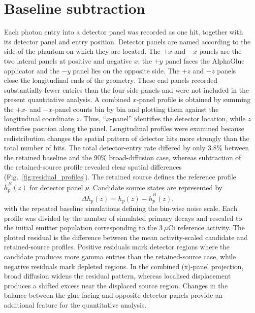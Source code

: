 \documentclass{iopconfser}
\begin{document}
\section{Baseline subtraction}

Each photon entry into a detector panel was recorded as one hit, together with its detector panel and entry position. Detector panels are named according to the side of the phantom on which they are located. The \(+x\) and \(-x\) panels are the two lateral panels at positive and negative \(x\); the \(+y\) panel faces the AlphaGlue applicator and the \(-y\) panel lies on the opposite side. The \(+z\) and \(-z\) panels close the longitudinal ends of the geometry. These end panels recorded substantially fewer entries than the four side panels and were not included in the present quantitative analysis. A combined \(x\)-panel profile is obtained by summing the \(+x\)- and \(-x\)-panel counts bin by bin and plotting them against the longitudinal coordinate \(z\). Thus, ``\(x\)-panel'' identifies the detector location, while \(z\) identifies position along the panel. Longitudinal profiles were examined because redistribution changes the spatial pattern of detector hits more strongly than the total number of hits. The total detector-entry rate differed by only 3.8\% between the retained baseline and the 90\% broad-diffusion case, whereas subtraction of the retained-source profile revealed clear spatial differences (Fig.~\ref{fig:residual_profiles}). The retained
source defines the reference profile \(\bar{h}^{B}_{p}(z)\) for detector panel
\(p\). Candidate source states are represented by
\begin{equation}
\Delta h_p(z)=h_p(z)-\bar{h}^{B}_{p}(z),
\end{equation}
with the repeated baseline simulations defining the bin-wise noise scale. Each profile was divided by the number of simulated primary decays and rescaled to the initial emitter population corresponding to the \(3~\mu\mathrm{Ci}\) reference activity. The plotted residual is the difference between the mean activity-scaled candidate and retained-source profiles. Positive residuals mark detector
regions where the candidate produces more gamma entries than the
retained-source case, while negative residuals mark depleted regions. In the
combined (x)-panel projection, broad diffusion widens the residual pattern,
whereas localised displacement produces a shifted excess near the displaced
source region. Changes in the balance between the glue-facing and opposite
detector panels provide an additional feature for the quantitative analysis.
\end{document}
